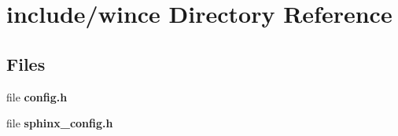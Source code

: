 \section{include/wince Directory Reference}
\label{dir_62c6e5a1b0f237231e4a7e8e8a0f0425}
\subsection*{Files}
\begin{DoxyCompactItemize}
\item 
file {\bfseries config.\+h}
\item 
file {\bfseries sphinx\+\_\+config.\+h}
\end{DoxyCompactItemize}
